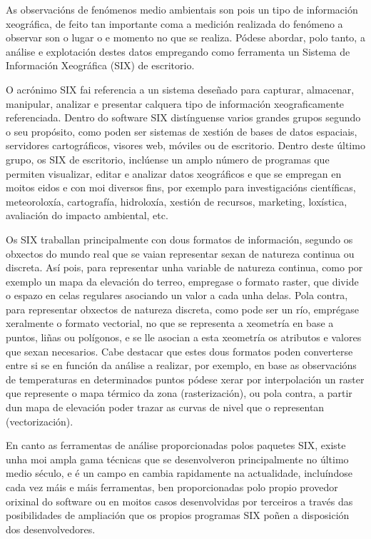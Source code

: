 As observacións de fenómenos medio ambientais son pois un tipo de información xeográfica, de feito tan importante coma a medición realizada do fenómeno a observar son o lugar o e momento no que se realiza. Pódese abordar, polo tanto, a análise e explotación destes datos empregando como ferramenta un Sistema de Información Xeográfica (SIX) de escritorio.

O acrónimo SIX fai referencia a un sistema deseñado para capturar, almacenar, manipular, analizar e presentar calquera tipo de información xeograficamente referenciada. Dentro do software SIX distínguense varios grandes grupos segundo o seu propósito, como poden ser sistemas de xestión de bases de datos espaciais, servidores cartográficos, visores web, móviles ou de escritorio. Dentro deste último grupo, os SIX de escritorio, inclúense un amplo número de programas que permiten visualizar, editar e analizar datos xeográficos e que se empregan en moitos eidos e con moi diversos fins, por exemplo para investigacións científicas, meteoroloxía, cartografía, hidroloxía, xestión de recursos, marketing, loxística, avaliación do impacto ambiental, etc.

Os SIX traballan principalmente con dous formatos de información, segundo os obxectos do mundo real que se vaian representar sexan de natureza continua ou discreta. Así pois, para representar unha variable de natureza continua, como por exemplo un mapa da elevación do terreo, empregase o formato raster, que divide o espazo en celas regulares asociando un valor a cada unha delas. Pola contra, para representar obxectos de natureza discreta, como pode ser un río, emprégase xeralmente o formato vectorial, no que se representa a xeometría en base a puntos, liñas ou polígonos, e se lle asocian a esta xeometría os atributos e valores que sexan necesarios. Cabe destacar que estes dous formatos poden converterse entre si se en función da análise a realizar, por exemplo, en base as observacións de temperaturas en determinados puntos pódese xerar por interpolación un raster que represente o mapa térmico da zona (rasterización), ou pola contra, a partir dun mapa de elevación poder trazar as curvas de nivel que o representan (vectorización).

En canto as ferramentas de análise proporcionadas polos paquetes SIX, existe unha moi ampla gama técnicas que se desenvolveron principalmente no último medio século, e é un campo en cambia rapidamente na actualidade, incluíndose cada vez máis e máis ferramentas, ben proporcionadas polo propio provedor orixinal do software ou en moitos casos desenvolvidas por terceiros a través das posibilidades de ampliación que os propios programas SIX poñen a disposición dos desenvolvedores.

